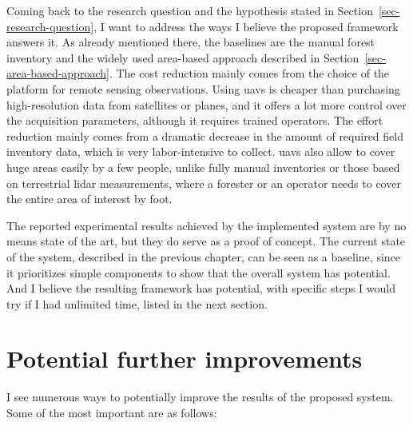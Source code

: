 Coming back to the research question and the hypothesis stated in Section~\ref{sec-research-question}, I want to address the ways I believe the proposed framework answers it.
As already mentioned there, the baselines are the manual forest inventory and the widely used area-based approach described in Section~\ref{sec-area-based-approach}.
The cost reduction mainly comes from the choice of the platform for remote sensing observations.
Using \glspl{uav} is cheaper than purchasing high-resolution data from satellites or planes, and it offers a lot more control over the acquisition parameters, although it requires trained operators.
The effort reduction mainly comes from a dramatic decrease in the amount of required field inventory data, which is very labor-intensive to collect.
\glspl{uav} also allow to cover huge areas easily by a few people, unlike fully manual inventories or those based on terrestrial \gls{lidar} measurements, where a forester or an operator needs to cover the entire area of interest by foot.

The reported experimental results achieved by the implemented system are by no means state of the art, but they do serve as a proof of concept.
The current state of the system, described in the previous chapter, can be seen as a baseline, since it prioritizes simple components to show that the overall system has potential.
And I believe the resulting framework has potential, with specific steps I would try if I had unlimited time, listed in the next section.

\section{Potential further improvements}

I see numerous ways to potentially improve the results of the proposed system.
Some of the most important are as follows:

